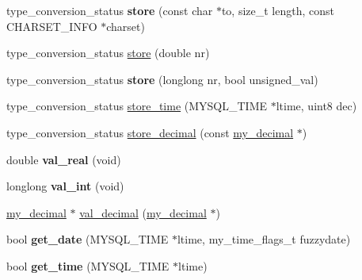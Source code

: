 \begin{DoxyCompactItemize}
\item 
\mbox{\label{classField__new__decimal_ab5aa36845a8f00402f3d6aaef50dc228}} 
type\+\_\+conversion\+\_\+status {\bfseries store} (const char $\ast$to, size\+\_\+t length, const C\+H\+A\+R\+S\+E\+T\+\_\+\+I\+N\+FO $\ast$charset)
\item 
type\+\_\+conversion\+\_\+status \mbox{\hyperlink{classField__new__decimal_a05d9f15a2a8a5148871c947dfe7a9dbe}{store}} (double nr)
\item 
\mbox{\label{classField__new__decimal_a1000c14ff5c4fa4d81286284d3ae8746}} 
type\+\_\+conversion\+\_\+status {\bfseries store} (longlong nr, bool unsigned\+\_\+val)
\item 
type\+\_\+conversion\+\_\+status \mbox{\hyperlink{classField__new__decimal_ab6f4b13ae308695dffd15cb0c39038d0}{store\+\_\+time}} (M\+Y\+S\+Q\+L\+\_\+\+T\+I\+ME $\ast$ltime, uint8 dec)
\item 
type\+\_\+conversion\+\_\+status \mbox{\hyperlink{classField__new__decimal_a15580620890eb78ffde70b2f54ad684f}{store\+\_\+decimal}} (const \mbox{\hyperlink{classmy__decimal}{my\+\_\+decimal}} $\ast$)
\item 
\mbox{\label{classField__new__decimal_aa5db817917654aa31808d9d948306f30}} 
double {\bfseries val\+\_\+real} (void)
\item 
\mbox{\label{classField__new__decimal_a76208d7866a58053616ea1a9669e1194}} 
longlong {\bfseries val\+\_\+int} (void)
\item 
\mbox{\hyperlink{classmy__decimal}{my\+\_\+decimal}} $\ast$ \mbox{\hyperlink{classField__new__decimal_a17f916c175e3c2520609d911574d9bde}{val\+\_\+decimal}} (\mbox{\hyperlink{classmy__decimal}{my\+\_\+decimal}} $\ast$)
\item 
\mbox{\label{classField__new__decimal_a39daf5263c660b40974d2be1f0a56f95}} 
bool {\bfseries get\+\_\+date} (M\+Y\+S\+Q\+L\+\_\+\+T\+I\+ME $\ast$ltime, my\+\_\+time\+\_\+flags\+\_\+t fuzzydate)
\item 
\mbox{\label{classField__new__decimal_ace3d3429c68c1db13fad5ce1c051f3cc}} 
bool {\bfseries get\+\_\+time} (M\+Y\+S\+Q\+L\+\_\+\+T\+I\+ME $\ast$ltime)
\item 

\end{DoxyCompactItemize}
